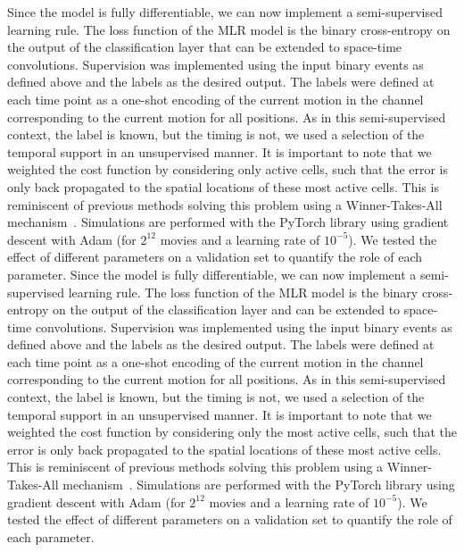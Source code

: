 \documentclass[default]{sn-jnl}%
\theoremstyle{thmstyleone}%
\theoremstyle{thmstyletwo}%
\theoremstyle{thmstylethree}%
\begin{document}
%
Since the model is fully differentiable, we can now implement a semi-supervised learning rule. The loss function of the MLR model is the binary cross-entropy on the output of the classification layer that can be extended to space-time convolutions. Supervision was implemented using the input binary events as defined above and the labels as the desired output. The labels were defined at each time point as a one-shot encoding of the current motion in the channel corresponding to the current motion for all positions. As in this semi-supervised context, the label is known, but the timing is not, we used a selection of the temporal support in an unsupervised manner. It is important to note that we weighted the cost function by considering only active cells, such that the error is only back propagated to the spatial locations of these most active cells. This is reminiscent of previous methods solving this problem using a Winner-Takes-All mechanism~\citep{masquelier_unsupervised_2007}. Simulations are performed with the PyTorch library using gradient descent with Adam (for $2^{12}$ movies and a learning rate of $10^{-5}$). We tested the effect of different parameters on a validation set to quantify the role of each parameter.
Since the model is fully differentiable, we can now implement a semi-supervised learning rule. The loss function of the MLR model is the binary cross-entropy on the output of the classification layer and can be extended to space-time convolutions. Supervision was implemented using the input binary events as defined above and the labels as the desired output. The labels were defined at each time point as a one-shot encoding of the current motion in the channel corresponding to the current motion for all positions. As in this semi-supervised context, the label is known, but the timing is not, we used a selection of the temporal support in an unsupervised manner. It is important to note that we weighted the cost function by considering only the  most active cells, such that the error is only back propagated to the spatial locations of these most active cells. This is reminiscent of previous methods solving this problem using a Winner-Takes-All mechanism~\citep{masquelier_unsupervised_2007}. Simulations are performed with the PyTorch library using gradient descent with Adam (for $2^{12}$ movies and a learning rate of $10^{-5}$). We tested the effect of different parameters on a validation set to quantify the role of each parameter.
\end{document}

